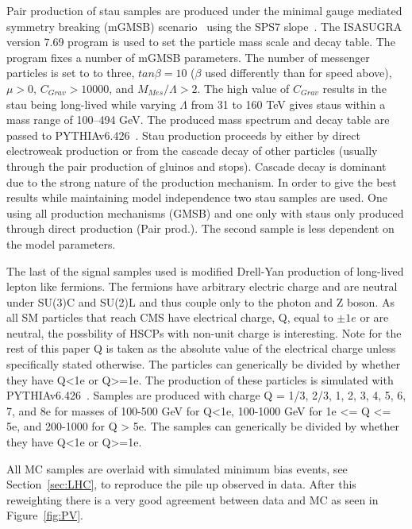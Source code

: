 
Pair production of stau samples are produced under the minimal gauge mediated symmetry breaking (mGMSB) scenario~\cite{GMSB} using the SPS7 slope~\cite{slopes}.
The ISASUGRA version 7.69 program is used to set the particle mass scale and decay table. The program fixes a number of mGMSB parameters. The number of messenger particles 
is set to to three, $tan \beta = 10$ ($\beta$ used differently than for speed above), $\mu>0$, $C_{Grav}>10000$, and $M_{Mes}/\Lambda>2$.
The high value of $C_{Grav}$ results in the stau being long-lived while varying $\Lambda$ from 31 to 160 TeV gives staus within a mass range of 100--494 GeV. The produced
mass spectrum and decay table are passed to PYTHIAv6.426~\cite{Pythia64}. Stau production proceeds by either by direct electroweak production or from the cascade
decay of other particles (usually through the pair production of gluinos and stops). Cascade decay is dominant due to the strong nature of the production mechanism.
In order to give the best results while maintaining model independence two stau samples are used. One using all production mechanisms (GMSB) and one only with staus only
produced through direct production (Pair prod.). The second sample is less dependent on the model parameters.

The last of the signal samples used is modified Drell-Yan production of long-lived lepton like fermions. The fermions have arbitrary electric charge and are
neutral under SU(3)C and SU(2)L and thus couple only to the photon and Z boson. As all SM particles that reach CMS have electrical charge, Q, equal to $\pm1e$ or
are neutral, the possbility of HSCPs with non-unit charge is interesting. Note for the rest of this paper Q is taken as the absolute value of the electrical charge
unless specifically stated otherwise. The particles can generically be divided by whether they have Q<1e or Q>=1e.
The production of these particles is simulated with PYTHIAv6.426~\cite{Pythia64}. Samples are produced with
charge Q = 1/3, 2/3, 1, 2, 3, 4, 5, 6, 7, and 8e for masses of 100-500 GeV for Q<1e, 100-1000 GeV for 1e <= Q <= 5e, and 200-1000 for Q > 5e. 
The samples can generically be divided by whether they have Q<1e or Q>=1e.

All MC samples are overlaid with simulated minimum bias events, see Section~\ref{sec:LHC}, to reproduce the pile up observed in data. After this reweighting there is a very
good agreement between data and MC as seen in Figure~\ref{fig:PV}.

